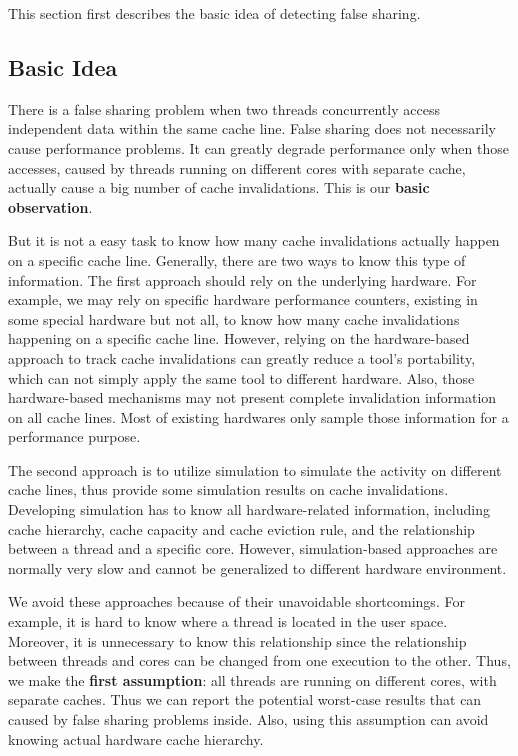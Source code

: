 \label{sec:detectfalseshare}

This section first describes the basic idea of detecting false sharing. 

\subsection{Basic Idea}
\label{sec:detectionidea}

There is a false sharing problem when two threads concurrently access independent data within the same cache line. False sharing does not necessarily cause performance problems. It can greatly degrade performance only when those accesses, caused by threads running on different cores with separate cache, actually cause a big number of cache invalidations. This is our \textbf{basic observation}. 

But it is not a easy task to know how many cache invalidations actually happen on a specific cache line. Generally, there are two ways to know this type of information. The first approach should rely on the underlying hardware. For example, we may rely on specific hardware performance counters, existing in some special hardware but not all, to know how many cache invalidations happening on a specific cache line. However, relying on the hardware-based approach to track cache invalidations can greatly reduce a tool's portability, which can not simply apply the same tool to different hardware. Also, those hardware-based mechanisms may not present complete invalidation information on all cache lines. Most of existing hardwares only sample those information for a performance purpose. 

The second approach is to utilize simulation to simulate the activity on different cache lines, thus provide some simulation results on cache invalidations. Developing simulation has to know all hardware-related information, including cache hierarchy, cache capacity and cache eviction rule, and the relationship between a thread and a specific core.  However, simulation-based approaches are normally very slow and cannot be generalized to different hardware environment. 

We avoid these approaches because of their unavoidable shortcomings. For example, it is hard to know where a thread is located in the user space. Moreover, it is unnecessary to know this relationship since the relationship between threads and cores can be changed from one execution to the other. Thus, we make the \textbf{ first assumption}: all threads are running on different cores, with separate caches. Thus we can report the potential worst-case results that can caused by false sharing problems inside. Also, using this assumption can avoid knowing actual hardware cache hierarchy. 


